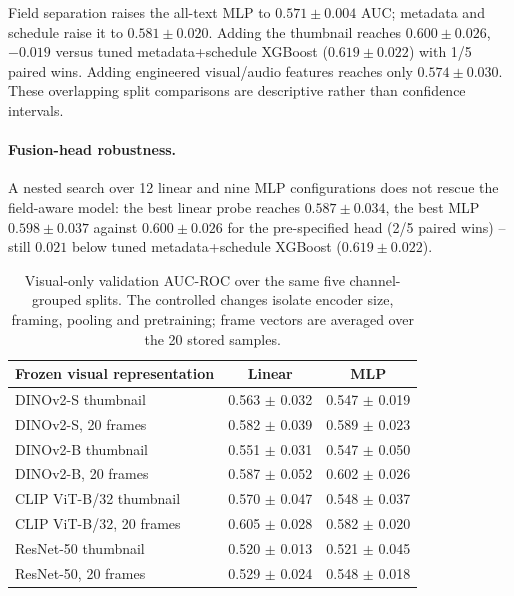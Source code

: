\documentclass[letterpaper]{article}
\begin{document}
Field separation raises the all-text MLP to $0.571\pm0.004$ AUC; metadata and schedule raise it to $0.581\pm0.020$. Adding the thumbnail reaches $0.600\pm0.026$, $-0.019$ versus tuned metadata+schedule XGBoost ($0.619\pm0.022$) with 1/5 paired wins. Adding engineered visual/audio features reaches only $0.574\pm0.030$. These overlapping split comparisons are descriptive rather than confidence intervals.

\paragraph{Fusion-head robustness.} A nested search over 12 linear and nine MLP configurations does not rescue the field-aware model: the best linear probe reaches $0.587\pm0.034$, the best MLP $0.598\pm0.037$ against $0.600\pm0.026$ for the pre-specified head (2/5 paired wins) -- still $0.021$ below tuned metadata+schedule XGBoost ($0.619\pm0.022$).

\begin{table}[t]
\centering
\small
\setlength{\tabcolsep}{3pt}
\begin{tabular}{l cc}
\toprule
Frozen visual representation & Linear & MLP \\
\midrule
DINOv2-S thumbnail & 0.563 \tiny{$\pm$ 0.032} & 0.547 \tiny{$\pm$ 0.019} \\
DINOv2-S, 20 frames & 0.582 \tiny{$\pm$ 0.039} & 0.589 \tiny{$\pm$ 0.023} \\
DINOv2-B thumbnail & 0.551 \tiny{$\pm$ 0.031} & 0.547 \tiny{$\pm$ 0.050} \\
DINOv2-B, 20 frames & 0.587 \tiny{$\pm$ 0.052} & 0.602 \tiny{$\pm$ 0.026} \\
CLIP ViT-B/32 thumbnail & 0.570 \tiny{$\pm$ 0.047} & 0.548 \tiny{$\pm$ 0.037} \\
CLIP ViT-B/32, 20 frames & 0.605 \tiny{$\pm$ 0.028} & 0.582 \tiny{$\pm$ 0.020} \\
ResNet-50 thumbnail & 0.520 \tiny{$\pm$ 0.013} & 0.521 \tiny{$\pm$ 0.045} \\
ResNet-50, 20 frames & 0.529 \tiny{$\pm$ 0.024} & 0.548 \tiny{$\pm$ 0.018} \\
\bottomrule
\end{tabular}
\caption{Visual-only validation AUC-ROC over the same five channel-grouped splits. The controlled changes isolate encoder size, framing, pooling and pretraining; frame vectors are averaged over the 20 stored samples.}
\label{tab:visual-ablation}
\end{table}
\end{document}

